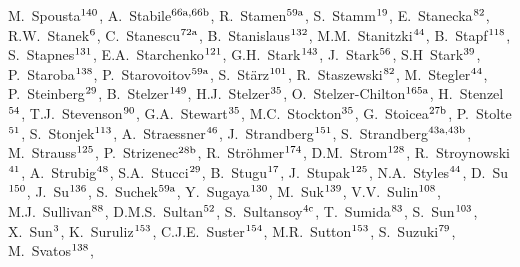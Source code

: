 \begin{flushleft}
M.~Spousta$^\textrm{\scriptsize 140}$,    
A.~Stabile$^\textrm{\scriptsize 66a,66b}$,    
R.~Stamen$^\textrm{\scriptsize 59a}$,    
S.~Stamm$^\textrm{\scriptsize 19}$,    
E.~Stanecka$^\textrm{\scriptsize 82}$,    
R.W.~Stanek$^\textrm{\scriptsize 6}$,    
C.~Stanescu$^\textrm{\scriptsize 72a}$,    
B.~Stanislaus$^\textrm{\scriptsize 132}$,    
M.M.~Stanitzki$^\textrm{\scriptsize 44}$,    
B.~Stapf$^\textrm{\scriptsize 118}$,    
S.~Stapnes$^\textrm{\scriptsize 131}$,    
E.A.~Starchenko$^\textrm{\scriptsize 121}$,    
G.H.~Stark$^\textrm{\scriptsize 143}$,    
J.~Stark$^\textrm{\scriptsize 56}$,    
S.H~Stark$^\textrm{\scriptsize 39}$,    
P.~Staroba$^\textrm{\scriptsize 138}$,    
P.~Starovoitov$^\textrm{\scriptsize 59a}$,    
S.~St\"arz$^\textrm{\scriptsize 101}$,    
R.~Staszewski$^\textrm{\scriptsize 82}$,    
M.~Stegler$^\textrm{\scriptsize 44}$,    
P.~Steinberg$^\textrm{\scriptsize 29}$,    
B.~Stelzer$^\textrm{\scriptsize 149}$,    
H.J.~Stelzer$^\textrm{\scriptsize 35}$,    
O.~Stelzer-Chilton$^\textrm{\scriptsize 165a}$,    
H.~Stenzel$^\textrm{\scriptsize 54}$,    
T.J.~Stevenson$^\textrm{\scriptsize 90}$,    
G.A.~Stewart$^\textrm{\scriptsize 35}$,    
M.C.~Stockton$^\textrm{\scriptsize 35}$,    
G.~Stoicea$^\textrm{\scriptsize 27b}$,    
P.~Stolte$^\textrm{\scriptsize 51}$,    
S.~Stonjek$^\textrm{\scriptsize 113}$,    
A.~Straessner$^\textrm{\scriptsize 46}$,    
J.~Strandberg$^\textrm{\scriptsize 151}$,    
S.~Strandberg$^\textrm{\scriptsize 43a,43b}$,    
M.~Strauss$^\textrm{\scriptsize 125}$,    
P.~Strizenec$^\textrm{\scriptsize 28b}$,    
R.~Str\"ohmer$^\textrm{\scriptsize 174}$,    
D.M.~Strom$^\textrm{\scriptsize 128}$,    
R.~Stroynowski$^\textrm{\scriptsize 41}$,    
A.~Strubig$^\textrm{\scriptsize 48}$,    
S.A.~Stucci$^\textrm{\scriptsize 29}$,    
B.~Stugu$^\textrm{\scriptsize 17}$,    
J.~Stupak$^\textrm{\scriptsize 125}$,    
N.A.~Styles$^\textrm{\scriptsize 44}$,    
D.~Su$^\textrm{\scriptsize 150}$,    
J.~Su$^\textrm{\scriptsize 136}$,    
S.~Suchek$^\textrm{\scriptsize 59a}$,    
Y.~Sugaya$^\textrm{\scriptsize 130}$,    
M.~Suk$^\textrm{\scriptsize 139}$,    
V.V.~Sulin$^\textrm{\scriptsize 108}$,    
M.J.~Sullivan$^\textrm{\scriptsize 88}$,    
D.M.S.~Sultan$^\textrm{\scriptsize 52}$,    
S.~Sultansoy$^\textrm{\scriptsize 4c}$,    
T.~Sumida$^\textrm{\scriptsize 83}$,    
S.~Sun$^\textrm{\scriptsize 103}$,    
X.~Sun$^\textrm{\scriptsize 3}$,    
K.~Suruliz$^\textrm{\scriptsize 153}$,    
C.J.E.~Suster$^\textrm{\scriptsize 154}$,    
M.R.~Sutton$^\textrm{\scriptsize 153}$,    
S.~Suzuki$^\textrm{\scriptsize 79}$,    
M.~Svatos$^\textrm{\scriptsize 138}$,    

\end{flushleft}
